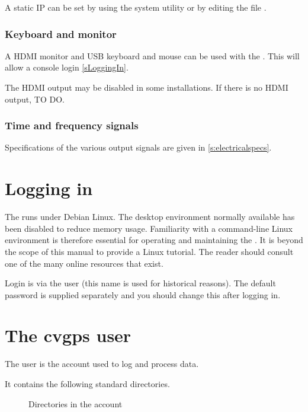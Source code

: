 A static IP can be set by using the system utility  or by editing the file 
.

\subsubsection{Keyboard and monitor}

A HDMI monitor and USB keyboard and mouse can be used with the \sysname{}. 
This will allow a console login \ref{sLoggingIn}.

The HDMI output may be disabled in some installations. If there is no HDMI output, TO DO. 

\subsubsection{Time and frequency signals}

Specifications of the various output signals are given in \ref{s:electricalspecs}.

\section{Logging in \label{sLoggingIn}}

The \sysname{} runs under Debian Linux. The desktop environment normally available has been disabled to reduce memory usage.
Familiarity with a command-line Linux environment is therefore essential for operating and maintaining
the \sysname{}. It is beyond the scope of this manual to provide a Linux tutorial. The reader should 
consult one of the many online resources that exist.

Login is via the user  (this name is used for historical reasons). 
The default password is supplied separately and you should change
this after logging in.

\section{The cvgps user}

The  user is the account used to log and process data.

It contains the following standard directories.

\begin{figure}[h]
\caption{Directories in the  account}
\end{figure}

